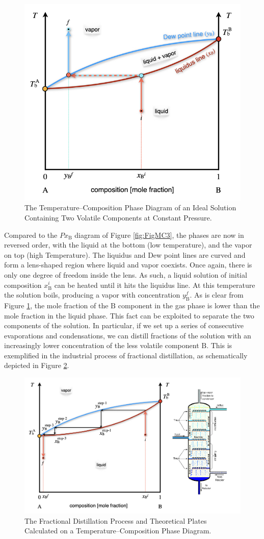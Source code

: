 \documentclass[
  9pt,
]{extbook}
\theoremstyle{definition}
\theoremstyle{definition}
\theoremstyle{definition}
\theoremstyle{remark}
\begin{document}
\begin{figure}

{\centering \includegraphics[width=0.6\linewidth]{./img/OEP_Figures.022} 

}

\caption{The Temperature–Composition Phase Diagram of an Ideal Solution Containing Two Volatile Components at Constant Pressure.}\label{fig:FigMC4}
\end{figure}

Compared to the \(Px_{\text{B}}\) diagram of Figure \ref{fig:FigMC3}, the phases are now in reversed order, with the liquid at the bottom (low temperature), and the vapor on top (high Temperature). The liquidus and Dew point lines are curved and form a lens-shaped region where liquid and vapor coexists. Once again, there is only one degree of freedom inside the lens. As such, a liquid solution of initial composition \(x_{\text{B}}^i\) can be heated until it hits the liquidus line. At this temperature the solution boils, producing a vapor with concentration \(y_{\text{B}}^f\). As is clear from Figure \ref{fig:FigMC4}, the mole fraction of the \(\text{B}\) component in the gas phase is lower than the mole fraction in the liquid phase. This fact can be exploited to separate the two components of the solution. In particular, if we set up a series of consecutive evaporations and condensations, we can distill fractions of the solution with an increasingly lower concentration of the less volatile component \(\text{B}\). This is exemplified in the industrial process of fractional distillation, as schematically depicted in Figure \ref{fig:FigMC5}.

\begin{figure}

{\centering \includegraphics[width=0.6\linewidth]{./img/OEP_Figures.023} 

}

\caption{The Fractional Distillation Process and Theoretical Plates Calculated on a Temperature–Composition Phase Diagram.}\label{fig:FigMC5}
\end{figure}
\end{document}
